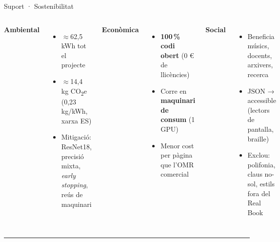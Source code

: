 \documentclass[aspectratio=169,10pt]{beamer}
\newcommand{\stat}[1]{{\AdwaitaHeavy\color{ink}#1}}
\begin{document}
\begin{frame}{Suport · Sostenibilitat}
  \vspace{0.2em}
  \begin{columns}[T]
    \textbf{\color{accent}Ambiental}
    {\small
    \begin{itemize}\setlength\itemsep{0.25em}
      \item $\approx$\stat{62,5 kWh} tot el projecte
      \item $\approx$\stat{14,4 kg} CO\textsubscript{2}e (0,23 kg/kWh, xarxa ES)
      \item Mitigació: ResNet18, precisió mixta, \textit{early stopping}, reús de maquinari
    \end{itemize}}

    \textbf{\color{accent}Econòmica}
    {\small
    \begin{itemize}\setlength\itemsep{0.25em}
      \item \textbf{100\,\% codi obert} (0 € de llicències)
      \item Corre en \textbf{maquinari de consum} (1 GPU)
      \item Menor cost per pàgina que l'OMR comercial
    \end{itemize}}

    \textbf{\color{accent}Social}
    {\small
    \begin{itemize}\setlength\itemsep{0.25em}
      \item Beneficia músics, docents, arxivers, recerca
      \item JSON → accessible (lectors de pantalla, braille)
      \item Exclou: polifonia, claus no-sol, estils fora del Real Book
    \end{itemize}}
  \end{columns}
  \vspace{0.4em}
  {\color{accent}\rule{\textwidth}{0.5pt}}\\[0.25em]
\end{frame}
\end{document}
